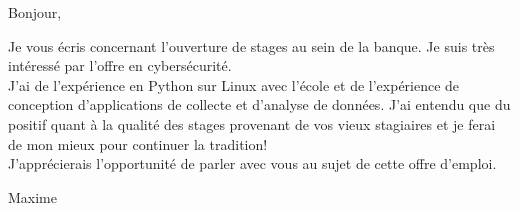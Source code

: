 \documentclass[12pt,french]{letter}
\begin{document}

\begin{letter}{}
\address{Montréal, Canada}

\opening{Bonjour,}


Je vous écris concernant l'ouverture de stages au sein de la banque. Je suis très intéressé par l'offre en cybersécurité.
\\J'ai de l'expérience en Python sur Linux avec l'école et de l'expérience de conception d'applications de collecte et d'analyse de données. J'ai entendu que du positif quant à la qualité des stages provenant de vos vieux stagiaires et je ferai de mon mieux pour continuer la tradition!
\\J'apprécierais l'opportunité de parler avec vous au sujet de cette offre d'emploi.

\closing{Maxime}


\end{letter}
\end{document}

